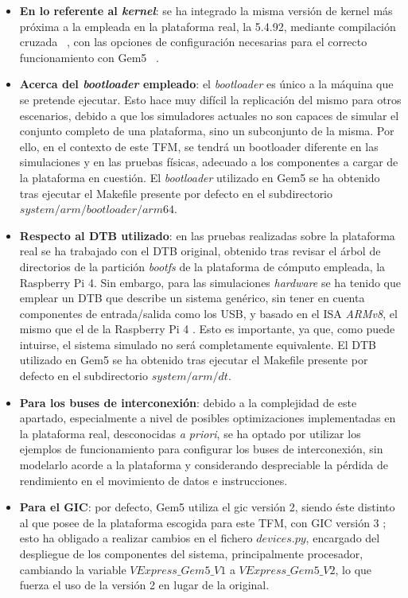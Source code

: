 \begin{itemize}
    \item \textbf{En lo referente al \textit{kernel}}: se ha integrado la misma versión de kernel más próxima a la empleada en la plataforma real, la 5.4.92, mediante compilación cruzada ~\cite{build-arm-kernel}, con las opciones de configuración necesarias para el correcto funcionamiento con Gem5 ~\cite{arm-linux-kernel-Gem5}.

    \item \textbf{Acerca del \textit{bootloader} empleado}: el \textit{bootloader} es único a la máquina que se pretende ejecutar. Esto hace muy difícil la replicación del mismo para otros escenarios, debido a que los simuladores actuales no son capaces de simular el conjunto completo de una plataforma, sino un subconjunto de la misma. Por ello, en el contexto de este \ac{TFM}, se tendrá un bootloader diferente en las simulaciones y en las pruebas físicas, adecuado a los componentes a cargar de la plataforma en cuestión. El \textit{bootloader} utilizado en Gem5 se ha obtenido tras ejecutar el Makefile presente por defecto en el subdirectorio $system/arm/bootloader/arm64$. 

    \item \textbf{Respecto al \ac{DTB} utilizado}: en las pruebas realizadas sobre la plataforma real se ha trabajado con el \ac{DTB} original, obtenido tras revisar el árbol de directorios de la partición \textit{bootfs} de la plataforma de cómputo empleada, la Raspberry Pi 4. Sin embargo, para las simulaciones \textit{hardware} se ha tenido que emplear un \ac{DTB} que describe un sistema genérico, sin tener en cuenta componentes de entrada/salida como los \ac{USB}, y basado en el \ac{ISA} \textit{ARMv8}, el mismo que el de la Raspberry Pi 4 \cite{arm-especificacion-arquitecturas}. Esto es importante, ya que, como puede intuirse, el sistema simulado no será completamente equivalente. El DTB utilizado en Gem5 se ha obtenido tras ejecutar el Makefile presente por defecto en el subdirectorio $system/arm/dt$. 

    \item \textbf{Para los buses de interconexión}: debido a la complejidad de este apartado, especialmente a nivel de posibles optimizaciones implementadas en la plataforma real, desconocidas \textit{a priori}, se ha optado por utilizar los ejemplos de funcionamiento para configurar los buses de interconexión, sin modelarlo acorde a la plataforma y considerando despreciable la pérdida de rendimiento en el movimiento de datos e instrucciones.

    \item \textbf{Para el \ac{GIC}}: por defecto, Gem5 utiliza el gic versión 2, siendo éste distinto al que posee de la plataforma escogida para este \ac{TFM}, con GIC versión 3 \cite{arm-a}; esto ha obligado a realizar cambios en el fichero $devices.py$, encargado del despliegue de los componentes del sistema, principalmente procesador, cambiando la variable $VExpress\_Gem5\_V1$ a $VExpress\_Gem5\_V2$, lo que fuerza el uso de la versión 2 en lugar de la original.
\end{itemize}

